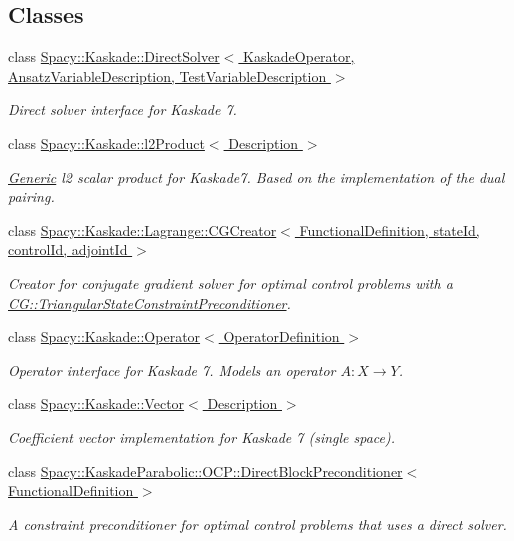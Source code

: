 \subsection*{Classes}
\begin{DoxyCompactItemize}
\item 
class \hyperlink{classSpacy_1_1Kaskade_1_1DirectSolver}{Spacy\-::\-Kaskade\-::\-Direct\-Solver$<$ Kaskade\-Operator, Ansatz\-Variable\-Description, Test\-Variable\-Description $>$}
\begin{DoxyCompactList}\small\item\em Direct solver interface for Kaskade 7. \end{DoxyCompactList}\item 
class \hyperlink{classSpacy_1_1Kaskade_1_1l2Product}{Spacy\-::\-Kaskade\-::l2\-Product$<$ Description $>$}
\begin{DoxyCompactList}\small\item\em \hyperlink{namespaceSpacy_1_1Generic}{Generic} l2 scalar product for Kaskade7. Based on the implementation of the dual pairing. \end{DoxyCompactList}\item 
class \hyperlink{classSpacy_1_1Kaskade_1_1Lagrange_1_1CGCreator}{Spacy\-::\-Kaskade\-::\-Lagrange\-::\-C\-G\-Creator$<$ Functional\-Definition, state\-Id, control\-Id, adjoint\-Id $>$}
\begin{DoxyCompactList}\small\item\em Creator for conjugate gradient solver for optimal control problems with a \hyperlink{classSpacy_1_1CG_1_1TriangularStateConstraintPreconditioner}{C\-G\-::\-Triangular\-State\-Constraint\-Preconditioner}. \end{DoxyCompactList}\item 
class \hyperlink{classSpacy_1_1Kaskade_1_1Operator}{Spacy\-::\-Kaskade\-::\-Operator$<$ Operator\-Definition $>$}
\begin{DoxyCompactList}\small\item\em Operator interface for Kaskade 7. Models an operator $A:X\rightarrow Y$. \end{DoxyCompactList}\item 
class \hyperlink{classSpacy_1_1Kaskade_1_1Vector}{Spacy\-::\-Kaskade\-::\-Vector$<$ Description $>$}
\begin{DoxyCompactList}\small\item\em Coefficient vector implementation for Kaskade 7 (single space). \end{DoxyCompactList}\item 
class \hyperlink{classSpacy_1_1KaskadeParabolic_1_1OCP_1_1DirectBlockPreconditioner}{Spacy\-::\-Kaskade\-Parabolic\-::\-O\-C\-P\-::\-Direct\-Block\-Preconditioner$<$ Functional\-Definition $>$}
\begin{DoxyCompactList}\small\item\em A constraint preconditioner for optimal control problems that uses a direct solver. \end{DoxyCompactList}\end{DoxyCompactItemize}
